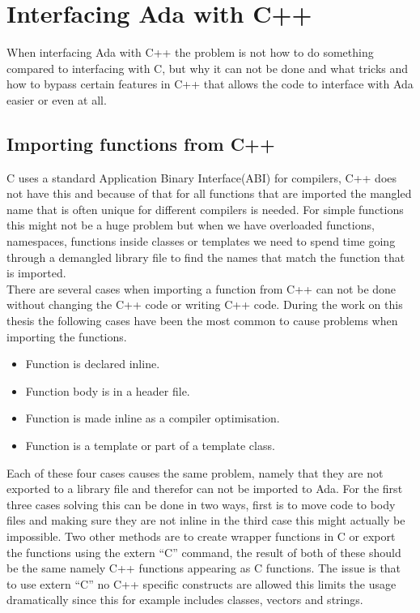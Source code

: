 \chapter{Interfacing Ada with C++}
When interfacing Ada with C++ the problem is not how to do something compared to interfacing with C, but why it can not be done and what tricks and how to bypass certain features in C++ that allows the code to interface with Ada easier or even at all.
\section{Importing functions from C++}
C uses a standard Application Binary Interface(ABI) for compilers, C++ does not have this and because of that for all functions that are imported the mangled name that is often unique for different compilers is needed. For simple functions this might not be a huge problem but when we have overloaded functions, namespaces, functions inside classes or templates we need to spend time going through a demangled library file to find the names that match the function that is imported.
\\
There are several cases when importing a function from C++ can not be done without changing the C++ code or writing C++ code. During the work on this thesis the following cases have been the most common to cause problems when importing the functions.
\begin{itemize}
\item Function is declared inline.
\item Function body is in a header file.
\item Function is made inline as a compiler optimisation.
\item Function is a template or part of a template class.
\end{itemize}
Each of these four cases causes the same problem, namely that they are not exported to a library file and therefor can not be imported to Ada. For the first three cases solving this can be done in two ways, first is to move code to body files and making sure they are not inline in the third case this might actually be impossible. Two other methods are to create wrapper functions in C or export the functions using the extern ``C'' command, the result of both of these should be the same namely C++ functions appearing as C functions. The issue is that to use extern ``C'' no C++ specific constructs are allowed this limits the usage dramatically since this for example includes classes, vectors and strings. 
\\

